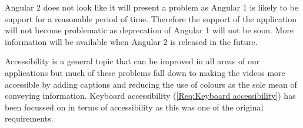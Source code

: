 Angular 2 does not look like it will present a problem as Angular 1 is likely to be support for a reasonable period of time. Therefore the support of the application will not become problematic as deprecation of Angular 1 will not be soon. More information will be available when Angular 2 is released in the future.

Accessibility is a general topic that can be improved in all areas of our applications but much of these problems fall down to making the videos more accessible by adding captions and reducing the use of colours as the sole mean of conveying information. Keyboard accessibility (\cref{Req:Keyboard accessibility}) has been focussed on in terms of accessibility as this was one of the original requirements.
